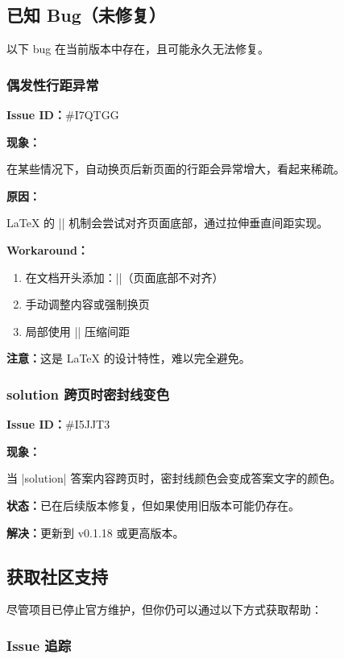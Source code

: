 \subsection{已知 Bug（未修复）}

以下 bug 在当前版本中存在，且可能永久无法修复。

\subsubsection{偶发性行距异常}

\textbf{Issue ID：}\#I7QTGG

\textbf{现象：}

在某些情况下，自动换页后新页面的行距会异常增大，看起来稀疏。

\textbf{原因：}

\LaTeX{} 的 |\flushbottom| 机制会尝试对齐页面底部，通过拉伸垂直间距实现。

\textbf{Workaround：}

\begin{enumerate}
  \item 在文档开头添加：|\raggedbottom|（页面底部不对齐）
  \item 手动调整内容或强制换页
  \item 局部使用 |\vspace{-1em}| 压缩间距
\end{enumerate}

\textbf{注意：}这是 \LaTeX{} 的设计特性，难以完全避免。

\subsubsection{solution 跨页时密封线变色}

\textbf{Issue ID：}\#I5JJT3

\textbf{现象：}

当 |solution| 答案内容跨页时，密封线颜色会变成答案文字的颜色。

\textbf{状态：}已在后续版本修复，但如果使用旧版本可能仍存在。

\textbf{解决：}更新到 v0.1.18 或更高版本。


\subsection{获取社区支持}

尽管项目已停止官方维护，但你仍可以通过以下方式获取帮助：

\subsubsection{Issue 追踪}


